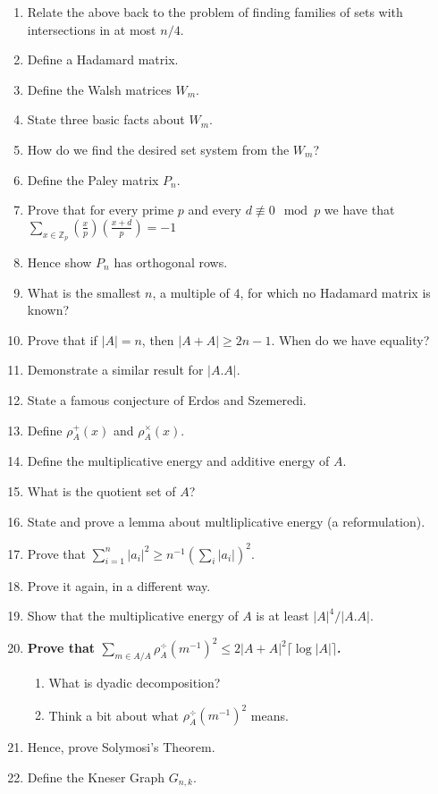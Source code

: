 \documentclass[10pt]{article}
\newcommand{\bb}[1]{\mathbb{#1}}
\newcommand{\Z}{\bb{Z}}
\begin{document}
\begin{enumerate}
    \item Relate the above back to the problem of finding families of sets with intersections in at most $n/4$.
    \item Define a Hadamard matrix.
    \item Define the Walsh matrices $W_m$.
    \item State three basic facts about $W_m$.
    \item How do we find the desired set system from the $W_m$?
    \item Define the Paley matrix $P_n$.
    \item Prove that for every prime $p$ and every $d\not\equiv 0 \mod p$ we have that $\sum_{x\in\Z_p} \left( \frac{x}{p}\right) \left(\frac{x+d}{p}\right) = -1$
    \item Hence show $P_n$ has orthogonal rows.
    \item What is the smallest $n$, a multiple of 4, for which no Hadamard matrix is known?
    \item Prove that if $|A| = n$, then $|A+A| \ge 2n-1$. When do we have equality?
    \item Demonstrate a similar result for $|A.A|$.
    \item State a famous conjecture of Erdos and Szemeredi.
    \item Define $\rho_A^+(x)$ and $\rho_A^\times(x)$.
    \item Define the multiplicative energy and additive energy of $A$.
    \item What is the quotient set of $A$?
    \item State and prove a lemma about multliplicative energy (a reformulation).
    \item Prove that $\sum_{i=1}^{n} |a_i|^2\ge n^{-1}(\sum_i|a_i|)^2$.
    \item Prove it again, in a different way.
    \item Show that the multiplicative energy of $A$ is at least $|A|^4/|A.A|$.
    \item \textbf{Prove that $\sum_{m\in A/A}\rho^\div_A(m^{-1})^2 \le 2|A+A|^2 \lceil \log |A| \rceil$.}
    \begin{enumerate}
        \item What is dyadic decomposition?
        \item Think a bit about what $\rho^\div_A(m^{-1})^2$ means.
    \end{enumerate}
    \item Hence, prove Solymosi's Theorem.
    \item Define the Kneser Graph $G_{n,k}$.

\end{enumerate}
\end{document}
